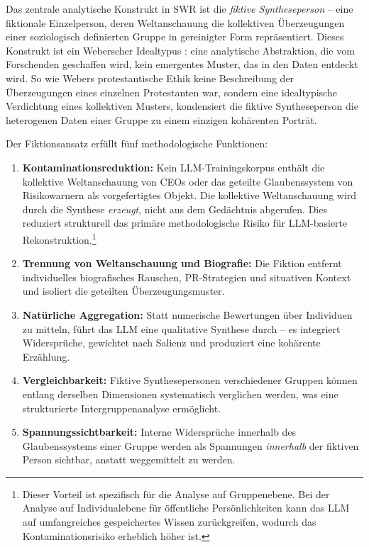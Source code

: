 \documentclass[11pt,a4paper]{article}
\begin{document}
Das zentrale analytische Konstrukt in SWR ist die \emph{fiktive Syntheseperson} -- eine fiktionale Einzelperson, deren Weltanschauung die kollektiven \"Uberzeugungen einer soziologisch definierten Gruppe in gereinigter Form repr\"asentiert. Dieses Konstrukt ist ein Weberscher Idealtypus \citep{Weber1904}: eine analytische Abstraktion, die vom Forschenden geschaffen wird, kein emergentes Muster, das in den Daten entdeckt wird. So wie Webers \glqq{}protestantische Ethik\grqq{} keine Beschreibung der \"Uberzeugungen eines einzelnen Protestanten war, sondern eine idealtypische Verdichtung eines kollektiven Musters, kondensiert die fiktive Syntheseperson die heterogenen Daten einer Gruppe zu einem einzigen koh\"arenten Portr\"at.

Der Fiktionsansatz erf\"ullt f\"unf methodologische Funktionen:

\begin{enumerate}[nosep]
  \item \textbf{Kontaminationsreduktion:} Kein LLM-Trainingskorpus enth\"alt \glqq{}die kollektive Weltanschauung von CEOs\grqq{} oder \glqq{}das geteilte Glaubenssystem von Risikowarnern\grqq{} als vorgefertigtes Objekt. Die kollektive Weltanschauung wird durch die Synthese \emph{erzeugt}, nicht aus dem Ged\"achtnis abgerufen. Dies reduziert strukturell das prim\"are methodologische Risiko f\"ur LLM-basierte Rekonstruktion.\footnote{Dieser Vorteil ist spezifisch f\"ur die Analyse auf Gruppenebene. Bei der Analyse auf Individualebene f\"ur \"offentliche Pers\"onlichkeiten kann das LLM auf umfangreiches gespeichertes Wissen zur\"uckgreifen, wodurch das Kontaminationsrisiko erheblich h\"oher ist.}
  \item \textbf{Trennung von Weltanschauung und Biografie:} Die Fiktion entfernt individuelles biografisches Rauschen, PR-Strategien und situativen Kontext und isoliert die geteilten \"Uberzeugungsmuster.
  \item \textbf{Nat\"urliche Aggregation:} Statt numerische Bewertungen \"uber Individuen zu mitteln, f\"uhrt das LLM eine qualitative Synthese durch -- es integriert Widerspr\"uche, gewichtet nach Salienz und produziert eine koh\"arente Erz\"ahlung.
  \item \textbf{Vergleichbarkeit:} Fiktive Synthesepersonen verschiedener Gruppen k\"onnen entlang derselben Dimensionen systematisch verglichen werden, was eine strukturierte Intergruppenanalyse erm\"oglicht.
  \item \textbf{Spannungssichtbarkeit:} Interne Widerspr\"uche innerhalb des Glaubenssystems einer Gruppe werden als Spannungen \emph{innerhalb} der fiktiven Person sichtbar, anstatt weggemittelt zu werden.
\end{enumerate}
\end{document}
